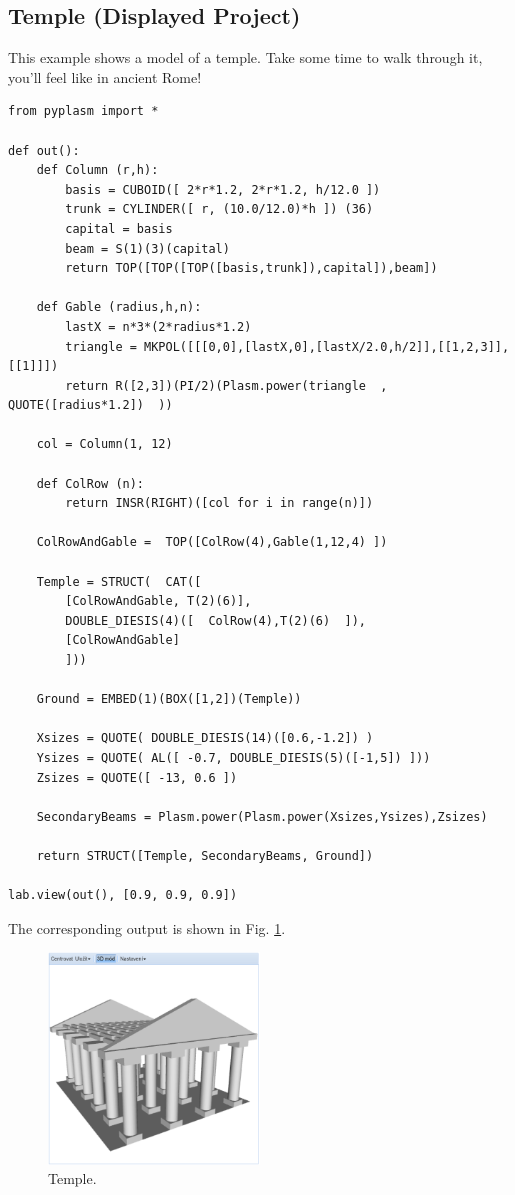 \documentclass[article,A4,12pt]{llncs}
\begin{document}
\subsection{Temple (Displayed Project)}

This example shows a model of a temple. Take some 
time to walk through it, you'll feel like in ancient Rome!
{\small
\begin{verbatim}
from pyplasm import *

def out():
    def Column (r,h):
        basis = CUBOID([ 2*r*1.2, 2*r*1.2, h/12.0 ]) 
        trunk = CYLINDER([ r, (10.0/12.0)*h ]) (36)
        capital = basis
        beam = S(1)(3)(capital) 
        return TOP([TOP([TOP([basis,trunk]),capital]),beam])

    def Gable (radius,h,n): 
        lastX = n*3*(2*radius*1.2)
        triangle = MKPOL([[[0,0],[lastX,0],[lastX/2.0,h/2]],[[1,2,3]],[[1]]])
        return R([2,3])(PI/2)(Plasm.power(triangle  , QUOTE([radius*1.2])  ))

    col = Column(1, 12)

    def ColRow (n): 
        return INSR(RIGHT)([col for i in range(n)])

    ColRowAndGable =  TOP([ColRow(4),Gable(1,12,4) ])

    Temple = STRUCT(  CAT([
        [ColRowAndGable, T(2)(6)], 
        DOUBLE_DIESIS(4)([  ColRow(4),T(2)(6)  ]), 
        [ColRowAndGable] 
        ]))
	
    Ground = EMBED(1)(BOX([1,2])(Temple))

    Xsizes = QUOTE( DOUBLE_DIESIS(14)([0.6,-1.2]) )
    Ysizes = QUOTE( AL([ -0.7, DOUBLE_DIESIS(5)([-1,5]) ]))
    Zsizes = QUOTE([ -13, 0.6 ])

    SecondaryBeams = Plasm.power(Plasm.power(Xsizes,Ysizes),Zsizes)

    return STRUCT([Temple, SecondaryBeams, Ground])

lab.view(out(), [0.9, 0.9, 0.9])
\end{verbatim}
}
\noindent
The corresponding output is shown in Fig. \ref{fig:temple}.

\begin{figure}[!ht]
\begin{center}
\includegraphics[width=0.5\textwidth]{img/temple.png}
\end{center}
\vspace{-2mm}
\caption{Temple.}
\label{fig:temple}
\end{figure}
\noindent
\end{document}
